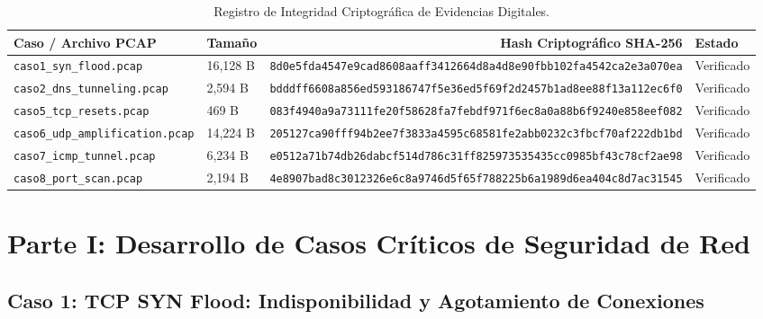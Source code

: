 \documentclass[11pt,letterpaper]{article}
\begin{document}
\begin{table}[H]
    \centering
    \footnotesize
    \begin{tabular}{@{}llrl@{}}
        \toprule
        \textbf{Caso / Archivo PCAP} & \textbf{Tamaño} & \textbf{Hash Criptográfico SHA-256} & \textbf{Estado} \\
        \midrule
        \texttt{caso1\_syn\_flood.pcap} & 16,128 B & \texttt{8d0e5fda4547e9cad8608aaff3412664d8a4d8e90fbb102fa4542ca2e3a070ea} & Verificado \\
        \texttt{caso2\_dns\_tunneling.pcap} & 2,594 B & \texttt{bdddff6608a856ed593186747f5e36ed5f69f2d2457b1ad8ee88f13a112ec6f0} & Verificado \\
        \texttt{caso5\_tcp\_resets.pcap} & 469 B & \texttt{083f4940a9a73111fe20f58628fa7febdf971f6ec8a0a88b6f9240e858eef082} & Verificado \\
        \texttt{caso6\_udp\_amplification.pcap} & 14,224 B & \texttt{205127ca90fff94b2ee7f3833a4595c68581fe2abb0232c3fbcf70af222db1bd} & Verificado \\
        \texttt{caso7\_icmp\_tunnel.pcap} & 6,234 B & \texttt{e0512a71b74db26dabcf514d786c31ff825973535435cc0985bf43c78cf2ae98} & Verificado \\
        \texttt{caso8\_port\_scan.pcap} & 2,194 B & \texttt{4e8907bad8c3012326e6c8a9746d5f65f788225b6a1989d6ea404c8d7ac31545} & Verificado \\
        \bottomrule
    \end{tabular}
    \caption{Registro de Integridad Criptográfica de Evidencias Digitales.}
\end{table}

\newpage
\section{Parte I: Desarrollo de Casos Críticos de Seguridad de Red}

\subsection{Caso 1: TCP SYN Flood: Indisponibilidad y Agotamiento de Conexiones}
\end{document}

